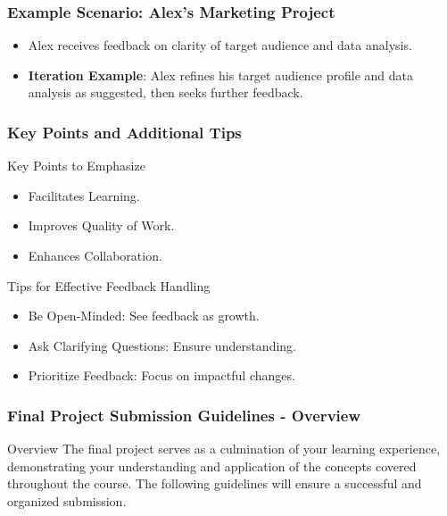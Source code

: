 \documentclass[aspectratio=169]{beamer}
\begin{document}
\begin{frame}[fragile]
    \frametitle{Example Scenario: Alex's Marketing Project}
    \begin{itemize}
        \item Alex receives feedback on clarity of target audience and data analysis.
        \item \textbf{Iteration Example}: Alex refines his target audience profile and data analysis as suggested, then seeks further feedback.
    \end{itemize}
\end{frame}

\begin{frame}[fragile]
    \frametitle{Key Points and Additional Tips}
    \begin{block}{Key Points to Emphasize}
        \begin{itemize}
            \item Facilitates Learning.
            \item Improves Quality of Work.
            \item Enhances Collaboration.
        \end{itemize}
    \end{block}
    \begin{block}{Tips for Effective Feedback Handling}
        \begin{itemize}
            \item Be Open-Minded: See feedback as growth.
            \item Ask Clarifying Questions: Ensure understanding.
            \item Prioritize Feedback: Focus on impactful changes.
        \end{itemize}
    \end{block}
\end{frame}

\begin{frame}[fragile]
    \frametitle{Final Project Submission Guidelines - Overview}
    \begin{block}{Overview}
        The final project serves as a culmination of your learning experience, demonstrating your understanding and application of the concepts covered throughout the course.
        The following guidelines will ensure a successful and organized submission.
    \end{block}
\end{frame}
\end{document}
